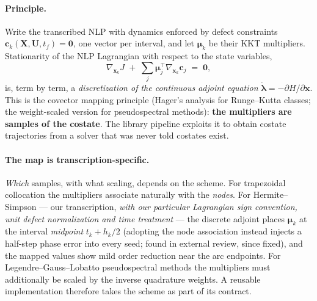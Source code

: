 \documentclass[11pt]{article}
\begin{document}
\paragraph{Principle.} Write the transcribed NLP with dynamics enforced by
defect constraints $\bm c_k(\bm X, \bm U, t_f) = \bm 0$, one vector per
interval, and let $\bm\mu_k$ be their KKT multipliers. Stationarity of the
NLP Lagrangian with respect to the state variables,
\begin{equation}
\nabla_{\bm x_k} J \;+\; \sum_j \bm\mu_j^{\top} \nabla_{\bm x_k}\bm c_j
\;=\; \bm 0,
\end{equation}
is, term by term, a \emph{discretization of the continuous adjoint
equation} $\dot{\bm\lambda} = -\partial H/\partial \bm x$. This is the
covector mapping principle (Hager's analysis for Runge--Kutta classes; the
weight-scaled version for pseudospectral methods): \textbf{the multipliers
are samples of the costate}. The library pipeline exploits it to obtain
costate trajectories from a solver that was never told costates exist.

\paragraph{The map is transcription-specific.} \emph{Which} samples, with
what scaling, depends on the scheme. For trapezoidal collocation the
multipliers associate naturally with the \emph{nodes}. For
Hermite--Simpson --- our transcription, \emph{with our particular
Lagrangian sign convention, unit defect normalization and time treatment}
--- the discrete adjoint places $\bm\mu_k$ at the interval \emph{midpoint}
$t_k + h_k/2$ (adopting the node
association instead injects a half-step phase error into every seed; found
in external review, since fixed), and the mapped values show mild order
reduction near the arc endpoints. For Legendre--Gauss--Lobatto
pseudospectral methods the multipliers must additionally be scaled by the
inverse quadrature weights. A reusable implementation therefore takes the
scheme as part of its contract.
\end{document}
